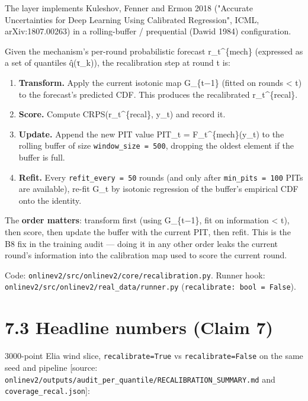 \documentclass[11pt,a4paper,openany]{report}
\begin{document}
The layer implements Kuleshov, Fenner and Ermon 2018 ("Accurate
Uncertainties for Deep Learning Using Calibrated Regression", ICML,
arXiv:1807.00263) in a rolling-buffer / prequential (Dawid 1984)
configuration.

Given the mechanism's per-round probabilistic forecast r\_t\textasciicircum{}\{mech\}
(expressed as a set of quantiles q̂(τ\_k)), the recalibration step at
round t is:

\begin{enumerate}
  \item \textbf{Transform.} Apply the current isotonic map G\_\{t−1\} (fitted on
    rounds < t) to the forecast's predicted CDF. This produces the
    recalibrated r\_t\textasciicircum{}\{recal\}.
  \item \textbf{Score.} Compute CRPS(r\_t\textasciicircum{}\{recal\}, y\_t) and record it.
  \item \textbf{Update.} Append the new PIT value PIT\_t = F\_t\textasciicircum{}\{mech\}(y\_t) to the
    rolling buffer of size \texttt{window\_size = 500}, dropping the oldest
    element if the buffer is full.
  \item \textbf{Refit.} Every \texttt{refit\_every = 50} rounds (and only after
    \texttt{min\_pits = 100} PITs are available), re-fit G\_t by isotonic
    regression of the buffer's empirical CDF onto the identity.
\end{enumerate}

The \textbf{order matters}: transform first (using G\_\{t−1\}, fit on
information < t), then score, then update the buffer with the current
PIT, then refit. This is the B8 fix in the training audit — doing it
in any other order leaks the current round's information into the
calibration map used to score the current round.

Code: \texttt{onlinev2/src/onlinev2/core/recalibration.py}. Runner hook:
\texttt{onlinev2/src/onlinev2/real\_data/runner.py}
(\texttt{recalibrate: bool = False}).

\section{7.3 Headline numbers (Claim 7)}

3000-point Elia wind slice, \texttt{recalibrate=True} vs \texttt{recalibrate=False}
on the same seed and pipeline [source:
\texttt{onlinev2/outputs/audit\_per\_quantile/RECALIBRATION\_SUMMARY.md} and
\texttt{coverage\_recal.json}]:
\end{document}
